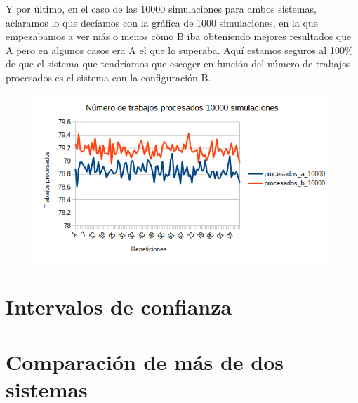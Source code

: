\documentclass[11pt,a4paper]{report}
\begin{document}
Y por último, en el caso de las 10000 simulaciones para ambos sistemas, aclaramos lo que decíamos con la gráfica de 1000 simulaciones, en la que empezabamos a ver más o menos cómo B iba obteniendo mejores resultados que A pero en algunos casos era A el que lo superaba. Aquí estamos seguros al 100\% de que el sistema que tendríamos que escoger en función del número de trabajos procesados es el sistema con la configuración B.

\begin{figure}[H]
\includegraphics[width=\textwidth]{img/cap-3/ttp_10000.png}
\caption{}
\label{}
\end{figure}

\section{Intervalos de confianza}

\section{Comparación de más de dos sistemas}
\end{document}
